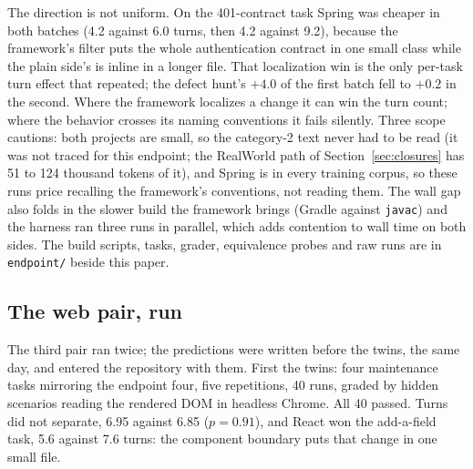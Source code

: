 \documentclass[journal]{IEEEtran}
\begin{document}
The direction is not uniform. On the
401-contract task Spring was cheaper in both batches (4.2 against 6.0
turns, then 4.2 against 9.2), because
the framework's filter puts the whole authentication contract in one
small class while the plain side's is inline in a longer file. That
localization win is the only per-task turn effect that repeated; the
defect hunt's $+4.0$ of the first batch fell to $+0.2$ in the second.
Where the framework localizes a change it can win the turn count;
where the behavior crosses its naming conventions it fails silently.
Three scope cautions: both projects are small, so
the category-2 text never had to be read (it was not traced for this
endpoint; the RealWorld path of Section~\ref{sec:closures} has 51 to 124 thousand tokens of it), and Spring is in every training corpus, so these runs
price recalling the framework's conventions, not reading them. The
wall gap also folds in the slower build the framework brings
(Gradle against \texttt{javac}) and the harness ran three runs in
parallel, which adds contention to wall time on both sides. The build
scripts, tasks, grader, equivalence probes and
raw runs are in \texttt{endpoint/} beside this paper.

\subsection{The web pair, run}
\label{sec:web}

The third pair ran twice; the predictions were written before the
twins, the same day, and entered the repository with them. First the
twins: four maintenance tasks mirroring the endpoint four, five
repetitions, 40 runs, graded by hidden scenarios reading the rendered
DOM in headless Chrome. All 40 passed. Turns did not separate, 6.95
against 6.85 ($p = 0.91$), and React won the add-a-field task, 5.6
against 7.6 turns: the component boundary puts that change in one
small file.
\end{document}
